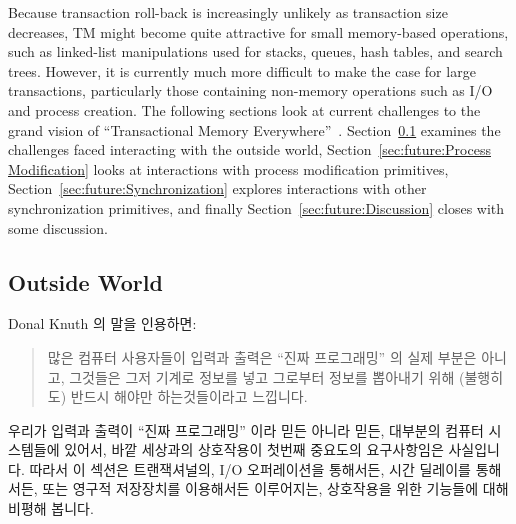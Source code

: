 Because transaction roll-back is increasingly unlikely as transaction
size decreases, TM might become quite attractive for small memory-based
operations,
such as linked-list manipulations used for stacks, queues, hash tables,
and search trees.
However, it is currently much more difficult to make the case for large
transactions, particularly those containing non-memory operations such
as I/O and process creation.
The following sections look at current challenges to the grand vision of
``Transactional Memory Everywhere''~\cite{PaulEMcKenney2009TMeverywhere}.
Section~\ref{sec:future:Outside World} examines the challenges faced
interacting with the outside world,
Section~\ref{sec:future:Process Modification} looks at interactions
with process modification primitives,
Section~\ref{sec:future:Synchronization} explores interactions with
other synchronization primitives, and finally
Section~\ref{sec:future:Discussion} closes with some discussion.
\fi

\subsection{Outside World}
\label{sec:future:Outside World}

Donal Knuth 의 말을 인용하면:

\begin{quote}
	많은 컴퓨터 사용자들이 입력과 출력은 ``진짜 프로그래밍'' 의 실제 부분은
	아니고, 그것들은 그저 기계로 정보를 넣고 그로부터 정보를 뽑아내기 위해
	(불행히도) 반드시 해야만 하는것들이라고 느낍니다.

\end{quote}

우리가 입력과 출력이 ``진짜 프로그래밍'' 이라 믿든 아니라 믿든, 대부분의 컴퓨터
시스템들에 있어서, 바깥 세상과의 상호작용이 첫번째 중요도의 요구사항임은
사실입니다.
따라서 이 섹션은 트랜잭셔널의, I/O 오퍼레이션을 통해서든, 시간 딜레이를
통해서든, 또는 영구적 저장장치를 이용해서든 이루어지는, 상호작용을 위한
기능들에 대해 비평해 봅니다.

